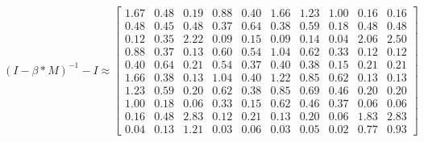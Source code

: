 \begin{equation}
	(I - \beta * M)^{-1} - I \approx \begin{bmatrix}
		1.67 & 0.48 & 0.19 & 0.88 & 0.40 & 1.66 & 1.23 & 1.00 & 0.16 & 0.16\\
		0.48 & 0.45 & 0.48 & 0.37 & 0.64 & 0.38 & 0.59 & 0.18 & 0.48 & 0.48\\
		0.12 & 0.35 & 2.22 & 0.09 & 0.15 & 0.09 & 0.14 & 0.04 & 2.06 & 2.50\\
		0.88 & 0.37 & 0.13 & 0.60 & 0.54 & 1.04 & 0.62 & 0.33 & 0.12 & 0.12\\
		0.40 & 0.64 & 0.21 & 0.54 & 0.37 & 0.40 & 0.38 & 0.15 & 0.21 & 0.21\\
		1.66 & 0.38 & 0.13 & 1.04 & 0.40 & 1.22 & 0.85 & 0.62 & 0.13 & 0.13\\
		1.23 & 0.59 & 0.20 & 0.62 & 0.38 & 0.85 & 0.69 & 0.46 & 0.20 & 0.20\\
		1.00 & 0.18 & 0.06 & 0.33 & 0.15 & 0.62 & 0.46 & 0.37 & 0.06 & 0.06\\
		0.16 & 0.48 & 2.83 & 0.12 & 0.21 & 0.13 & 0.20 & 0.06 & 1.83 & 2.83\\
		0.04 & 0.13 & 1.21 & 0.03 & 0.06 & 0.03 & 0.05 & 0.02 & 0.77 & 0.93
	\end{bmatrix}
	\label{frml:berechnungDerKatzZentralitaet:formel5}
\end{equation}